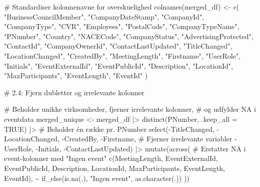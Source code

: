 \documentclass[
  11pt,
  letterpaper,
  DIV=11,
  numbers=noendperiod]{scrartcl}
\newenvironment{Shaded}{\begin{snugshade}}{\end{snugshade}}
\newcommand{\AttributeTok}[1]{\textcolor[rgb]{0.40,0.45,0.13}{#1}}
\newcommand{\CommentTok}[1]{\textcolor[rgb]{0.37,0.37,0.37}{#1}}
\newcommand{\ConstantTok}[1]{\textcolor[rgb]{0.56,0.35,0.01}{#1}}
\newcommand{\FunctionTok}[1]{\textcolor[rgb]{0.28,0.35,0.67}{#1}}
\newcommand{\NormalTok}[1]{\textcolor[rgb]{0.00,0.23,0.31}{#1}}
\newcommand{\OtherTok}[1]{\textcolor[rgb]{0.00,0.23,0.31}{#1}}
\newcommand{\SpecialCharTok}[1]{\textcolor[rgb]{0.37,0.37,0.37}{#1}}
\newcommand{\StringTok}[1]{\textcolor[rgb]{0.13,0.47,0.30}{#1}}
\begin{document}
\begin{Shaded}
\begin{Highlighting}[]
\CommentTok{\# Standardiser kolonnenavne for overskuelighed}
\FunctionTok{colnames}\NormalTok{(merged\_df) }\OtherTok{\textless{}{-}} \FunctionTok{c}\NormalTok{(}
  \StringTok{"BusinessCouncilMember"}\NormalTok{, }\StringTok{"CompanyDateStamp"}\NormalTok{, }\StringTok{"CompanyId"}\NormalTok{, }\StringTok{"CompanyType"}\NormalTok{,}
  \StringTok{"CVR"}\NormalTok{, }\StringTok{"Employees"}\NormalTok{, }\StringTok{"PostalCode"}\NormalTok{, }\StringTok{"CompanyTypeName"}\NormalTok{, }\StringTok{"PNumber"}\NormalTok{, }\StringTok{"Country"}\NormalTok{,}
  \StringTok{"NACECode"}\NormalTok{, }\StringTok{"CompanyStatus"}\NormalTok{, }\StringTok{"AdvertisingProtected"}\NormalTok{, }\StringTok{"ContactId"}\NormalTok{,}
  \StringTok{"CompanyOwnerId"}\NormalTok{, }\StringTok{"ContactLastUpdated"}\NormalTok{, }\StringTok{"TitleChanged"}\NormalTok{, }\StringTok{"LocationChanged"}\NormalTok{,}
  \StringTok{"CreatedBy"}\NormalTok{, }\StringTok{"MeetingLength"}\NormalTok{, }\StringTok{"Firstname"}\NormalTok{, }\StringTok{"UserRole"}\NormalTok{, }\StringTok{"Initials"}\NormalTok{,}
  \StringTok{"EventExternalId"}\NormalTok{, }\StringTok{"EventPublicId"}\NormalTok{, }\StringTok{"Description"}\NormalTok{, }\StringTok{"LocationId"}\NormalTok{,}
  \StringTok{"MaxParticipants"}\NormalTok{, }\StringTok{"EventLength"}\NormalTok{, }\StringTok{"EventId"}
\NormalTok{)}

\CommentTok{\# 2.4: Fjern dubletter og irrelevante kolonner}

\CommentTok{\# Beholder unikke virksomheder, fjerner irrelevante kolonner,}
\CommentTok{\# og udfylder NA i eventdata}
\NormalTok{merged\_unique }\OtherTok{\textless{}{-}}\NormalTok{ merged\_df }\SpecialCharTok{|\textgreater{}}
  \FunctionTok{distinct}\NormalTok{(PNumber, }\AttributeTok{.keep\_all =} \ConstantTok{TRUE}\NormalTok{) }\SpecialCharTok{|\textgreater{}}  \CommentTok{\# Beholder én række pr. PNumber}
  \FunctionTok{select}\NormalTok{(}\SpecialCharTok{{-}}\NormalTok{TitleChanged, }\SpecialCharTok{{-}}\NormalTok{LocationChanged, }\SpecialCharTok{{-}}\NormalTok{CreatedBy, }\SpecialCharTok{{-}}\NormalTok{Firstname,  }
         \CommentTok{\# Fjerner irrelevante variabler}
         \SpecialCharTok{{-}}\NormalTok{UserRole, }\SpecialCharTok{{-}}\NormalTok{Initials, }\SpecialCharTok{{-}}\NormalTok{ContactLastUpdated) }\SpecialCharTok{|\textgreater{}}
  \FunctionTok{mutate}\NormalTok{(}\FunctionTok{across}\NormalTok{(  }\CommentTok{\# Erstatter NA i event{-}kolonner med "Ingen event"}
    \FunctionTok{c}\NormalTok{(MeetingLength, EventExternalId, EventPublicId, Description, }
\NormalTok{      LocationId, MaxParticipants, EventLength, EventId),}
    \SpecialCharTok{\textasciitilde{}} \FunctionTok{if\_else}\NormalTok{(}\FunctionTok{is.na}\NormalTok{(.), }\StringTok{"Ingen event"}\NormalTok{, }\FunctionTok{as.character}\NormalTok{(.))}
\NormalTok{  ))}


\end{Highlighting}
\end{Shaded}
\end{document}
